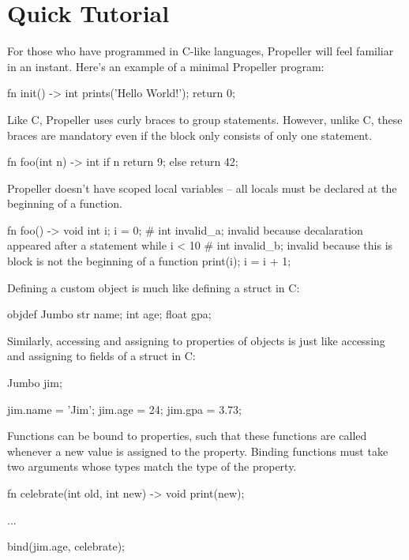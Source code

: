 \section{Quick Tutorial} 

For those who have programmed in C-like languages, Propeller will feel familiar in
an instant. Here's an example of a minimal Propeller program:

\begin{mylisting}
fn init() -> int
{
  prints('Hello World!\n');
  return 0;
}
\end{mylisting}

\noindent
Like C, Propeller uses curly braces to group statements. However, unlike C,
these braces are mandatory even if the block only consists of only one statement.

\begin{mylisting}
fn foo(int n) -> int
{
  if n %
  { return 9; }
  else
  { return 42; }
}
\end{mylisting}

\noindent
Propeller doesn't have scoped local variables -- all locals must be declared at the beginning of a function.

\begin{mylisting}
fn foo() -> void
{
  int i;
  i = 0;
  # int invalid_a;     invalid because decalaration appeared after a statement
  while i < 10
  {
    # int invalid_b;   invalid because this is block is not the beginning of a function
    print(i);
    i = i + 1;
  }
}
\end{mylisting}

\noindent
Defining a custom object is much like defining a struct in C:
\begin{mylisting}
objdef Jumbo
{
  str name;
  int age;
  float gpa;
}
\end{mylisting}

\noindent
Similarly, accessing and assigning to properties of objects is just like accessing and assigning to fields of a struct in C:

\begin{mylisting}
Jumbo jim;

jim.name = 'Jim';
jim.age  = 24;
jim.gpa  = 3.73;
\end{mylisting}

\noindent
Functions can be bound to properties, such that these functions are called whenever
a new value is assigned to the property. Binding functions must take two arguments
whose types match the type of the property.

\begin{mylisting}
fn celebrate(int old, int new) -> void
{
  print(new);
}

...

  bind(jim.age, celebrate);
\end{mylisting}
